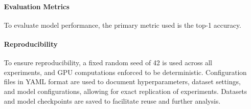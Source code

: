 \paragraph{Evaluation Metrics}
To evaluate model performance, the primary metric used is the top-1 accuracy.


\paragraph{Reproducibility}
To ensure reproducibility, a fixed random seed of 42 is used across all experiments, and GPU computations enforced to be deterministic. Configuration files in YAML format are used to document hyperparameters, dataset settings, and model configurations, allowing for exact replication of experiments. Datasets and model checkpoints are saved to facilitate reuse and further analysis.





